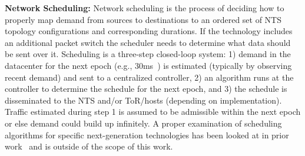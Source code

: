 



{\bf Network Scheduling:} Network scheduling is the process of deciding how to
properly map demand from sources to destinations to an ordered set of NTS
topology configurations and corresponding durations. If the technology includes
an additional packet switch the scheduler needs to determine what data should be
sent over it. Scheduling is a three-step closed-loop system: 1) demand in the
datacenter for the next epoch (e.g., 30ms~\cite{TODO}) is estimated (typically
by observing recent demand) and sent to a centralized controller, 2) an
algorithm runs at the controller to determine the schedule for the next epoch,
and 3) the schedule is disseminated to the NTS and/or ToR/hosts (depending on
implementation). Traffic estimated during step 1 is assumed to be admissible
within the next epoch or else demand could build up infinitely. A proper
examination of scheduling algorithms for specific next-generation technologies
has been looked at in prior work~\cite{solstice, eclpise} and is outside of the
scope of this work.

